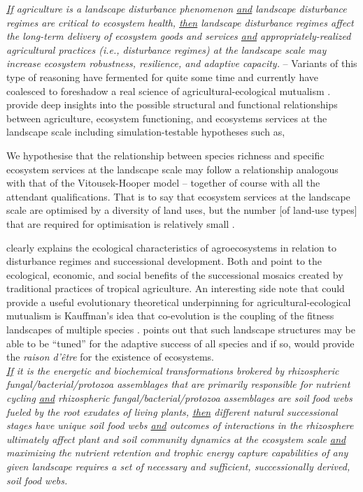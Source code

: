 \documentclass[twoside]{article}	%
\newenvironment{myindentpar}[1]%
   {\begin{list}{}%
       {\setlength{\leftmargin}{#1}}%
           \item[]%
   }
     {\end{list}}
\begin{document}
\textit{\underline{If} agriculture is a landscape disturbance phenomenon \underline{and} landscape disturbance regimes are critical to ecosystem health, \underline{then} landscape disturbance regimes affect the long-term delivery of ecosystem goods and services \underline{and} appropriately-realized agricultural practices (i.e., disturbance regimes) at the landscape scale may increase ecosystem robustness, resilience, and adaptive capacity.} -- Variants of this type of reasoning have fermented for quite some time and currently have coalesced to foreshadow a real science of agricultural-ecological mutualism \citep{swift_biodiversity_2004, gliessman_agroecology:_2015}. \citet{swift_biodiversity_2004} provide deep insights into the possible structural and functional relationships between agriculture, ecosystem functioning, and ecosystems services at the landscape scale including simulation-testable hypotheses such as,
\begin{myindentpar}{2em}
We hypothesise that the relationship between species richness and specific ecosystem services at the landscape scale may follow a relationship analogous with that of the Vitousek-Hooper model -- together of course with all the attendant qualifications. That is to say that ecosystem services at the landscape scale are optimised by a diversity of land uses, but the number [of land-use types] that are required for optimisation is relatively small \citep{swift_biodiversity_2004}.
\end{myindentpar}
\citet{gliessman_agroecology:_2015} clearly explains the ecological characteristics of agroecosystems in relation to disturbance regimes and successional development.  Both \citet{swift_biodiversity_2004} and \citet{gliessman_agroecology:_2015} point to the ecological, economic, and social benefits of the successional mosaics created by traditional practices of tropical agriculture. An interesting side note that could provide a useful evolutionary theoretical underpinning for agricultural-ecological mutualism is Kauffman's idea that co-evolution is the coupling of the fitness landscapes of multiple species \citep{kauffman_origins_1993}. \citet{kauffman_origins_1993} points out that such landscape structures may be able to be \enquote{tuned} for the adaptive success of all species and if so, would provide the \textit{raison d'\^{e}tre} for the existence of ecosystems.\\

\textit{\underline{If} it is the energetic and biochemical transformations brokered by rhizospheric fungal/bacterial/protozoa assemblages that are primarily responsible for nutrient cycling \underline{and} rhizospheric fungal/bacterial/protozoa assemblages are soil food webs fueled by the root exudates of living plants, \underline{then} different natural successional stages have unique soil food webs \underline{and} outcomes of interactions in the rhizosphere ultimately affect plant and soil community dynamics at the ecosystem scale \underline{and} maximizing the nutrient retention and trophic energy capture capabilities of any given landscape requires a set of necessary and sufficient, successionally derived, soil food webs.}\\
\end{document}
